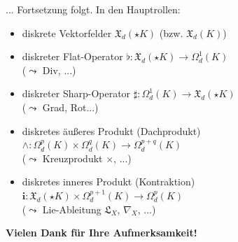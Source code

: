 \documentclass[handout]{beamer}
\begin{document}
  \begin{frame}
    \begin{block}{... Fortsetzung folgt.}
      \pause
      In den Hauptrollen:
      \begin{itemize}
        \item diskrete Vektorfelder \( \mathfrak{X}_{d}(\star K)  \) (bzw. \( \mathfrak{X}_{d}(K)  \))
        \pause
        \item diskreter Flat-Operator \( \flat: \mathfrak{X}_{d}(\star K) \longrightarrow \Omega_{d}^{1}(K) \) \\
              (\( \leadsto  \) Div, ...)
        \pause
        \item diskreter Sharp-Operator \( \sharp: \Omega_{d}^{1}(K) \longrightarrow \mathfrak{X}_{d}(\star K)\) \\
              (\( \leadsto  \) Grad, Rot...)
        \pause
        \item diskretes äußeres Produkt (Dachprodukt) \( \wedge: \Omega_{d}^{p}(K)\times\Omega_{d}^{q}(K) \longrightarrow  \Omega_{d}^{p+q}(K) \) \\
              (\( \leadsto  \) Kreuzprodukt \( \times \), ...)
        \pause
        \item diskretes inneres Produkt (Kontraktion) \( \mathbf{i}: \mathfrak{X}_{d}(\star K) \times \Omega_{d}^{p+1}(K) \longrightarrow \Omega_{d}^{p}(K)\) \\
              (\( \leadsto  \) Lie-Ableitung \( \mathfrak{L}_{X} \), \( \nabla_{X} \), ...)
      \end{itemize}
    \end{block}

    \pause
    \begin{block}{}
      \centering \large \textbf{Vielen Dank für Ihre Aufmerksamkeit!}
    \end{block}
  \end{frame}
\end{document}
